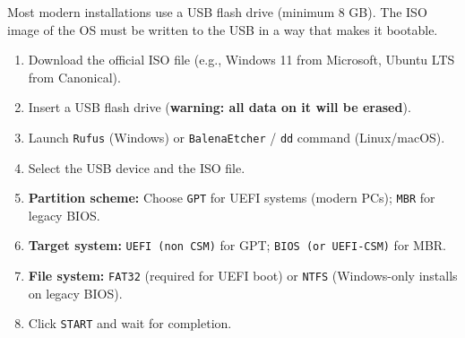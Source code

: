 \documentclass[11pt]{article}
\begin{document}
\begin{methode}
Most modern installations use a USB flash drive (minimum 8 GB). The ISO image of the OS must be written to the USB in a way that makes it bootable.
\begin{enumerate}
    \item Download the official ISO file (e.g., Windows 11 from Microsoft, Ubuntu LTS from Canonical).
    \item Insert a USB flash drive (\textbf{warning: all data on it will be erased}).
    \item Launch \texttt{Rufus} (Windows) or \texttt{BalenaEtcher} / \texttt{dd} command (Linux/macOS).
    \item Select the USB device and the ISO file.
    \item \textbf{Partition scheme:} Choose \texttt{GPT} for UEFI systems (modern PCs); \texttt{MBR} for legacy BIOS.
    \item \textbf{Target system:} \texttt{UEFI (non CSM)} for GPT; \texttt{BIOS (or UEFI-CSM)} for MBR.
    \item \textbf{File system:} \texttt{FAT32} (required for UEFI boot) or \texttt{NTFS} (Windows-only installs on legacy BIOS).
    \item Click \texttt{START} and wait for completion.
\end{enumerate}
\end{methode}
\end{document}

